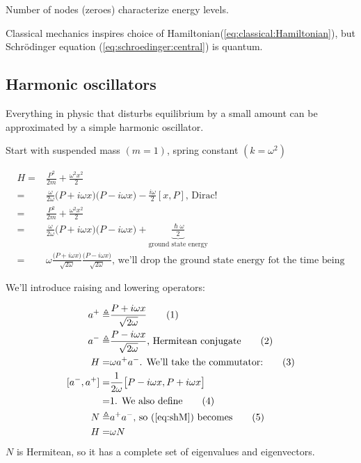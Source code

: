 \documentclass[]{article}
\newcommand\numberthis{\addtocounter{equation}{1}\tag{\theequation}}
\begin{document}
Number of nodes (zeroes) characterize energy levels.

Classical mechanics inspires choice of Hamiltonian(\ref{eq:classical:Hamiltonian}), but Schr\"odinger equation (\ref{eq:schroedinger:central}) is quantum.

\subsection{Harmonic oscillators}

Everything in physic that disturbs equilibrium by a small amount can be approximated by a simple harmonic oscillator. 

Start with suspended mass $(m=1)$, spring constant $(k=\omega^2)$

\begin{align*}
H =& \frac{P^2}{2m} + \frac{\omega^2 x^2}{2}\\
=& \frac{\omega}{2 \omega}\big(P + i \omega x \big)\big(P - i \omega x \big) - \frac{i \omega}{2} [x,P] \text{, Dirac!}\\
=& \frac{P^2}{2m} + \frac{\omega^2 x^2}{2}\\
=& \frac{\omega}{2 \omega}\big(P + i \omega x \big)\big(P - i \omega x \big) + \underbrace{\frac{\hslash \omega}{2}}_\text{ground state energy}\\
=&\omega \frac{\big(P + i \omega x \big)}{\sqrt{2 \omega}}\frac{\big(P - i \omega x \big)}{\sqrt{2 \omega}}\text{, we'll drop the ground state energy fot the time being}
\end{align*}

We'll introduce raising and lowering operators:

\begin{align*}
a^+ \triangleq & \frac{P + i \omega x } {\sqrt{2 \omega}} \numberthis \label{eq:creation:operator}\\
a^- \triangleq & \frac{P - i \omega x } {\sqrt{2 \omega}}\text{, Hermitean conjugate} \numberthis \label{eq:annihilation:operator}\\
H =& \omega a^+ a^-\text{. We'll take the commutator:}\numberthis \label{eq:shM}\\
[a^-,a^+] =& \frac{1}{2\omega}\big[P - i \omega x,P + i \omega x\big]\\
=& 1\text{. We also define} \numberthis \label{eq:a:comm}\\
N \triangleq& a^+a^-\text{, so (\ref{eq:shM}) becomes} \numberthis \label{eq:number:operator}\\
H =& \omega N
\end{align*}
$N$ is Hermitean, so it has a complete set of eigenvalues and eigenvectors.
\end{document}
